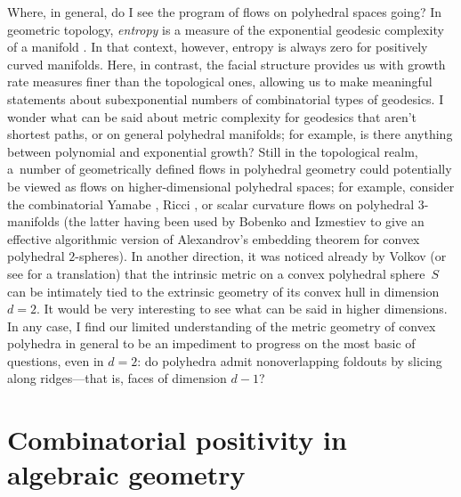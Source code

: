 \documentclass[11pt]{proposal}
\begin{document}
Where, in general, do I see the program of flows on polyhedral spaces
going?  In geometric topology, \emph{entropy} is a measure of the
exponential geodesic complexity of a manifold \cite{manning79}.  In
that context, however, entropy is always zero for positively curved
manifolds.  Here, in contrast, the facial structure provides us with
growth rate measures finer than the topological ones,
allowing us to make meaningful statements about subexponential numbers
of combinatorial types of geodesics.  I wonder what can be said about
metric complexity for geodesics that aren't shortest paths, or on
general polyhedral manifolds; for example, is there anything between
polynomial and exponential growth?  Still in the topological realm,
a~number of geometrically defined flows in polyhedral geometry could
potentially be viewed as flows on higher-dimensional polyhedral
spaces; for example, consider the combinatorial Yamabe \cite{glick05},
Ricci \cite{CL03}, or scalar curvature flows on polyhedral
$3$-manifolds (the latter having been used by Bobenko and Izmestiev
\cite{BI06} to give an effective algorithmic version of Alexandrov's
embedding theorem for convex polyhedral $2$-spheres).  In another
direction, it was noticed already by Volkov \cite{Vol68} (or see
\cite[Section~12.1]{Ale50} for a translation) that the intrinsic
metric on a convex polyhedral sphere~$S$ can be intimately tied to the
extrinsic geometry of its convex hull in dimension $d=2$.  It would be
very interesting to see what can be said in higher dimensions.  In any
case, I find our limited understanding of the metric geometry of
convex polyhedra in general to be an impediment to progress on the
most basic of questions, even in $d=2$: do polyhedra admit
nonoverlapping foldouts by slicing along ridges---that is, faces of
dimension $d-1$?


\section{Combinatorial positivity in algebraic geometry}%


\label{s:positivity}
\end{document}
